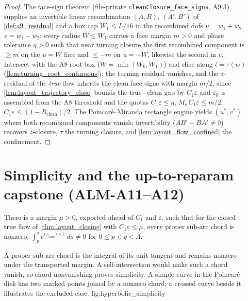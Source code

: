 \begin{proof}
  \leanok
  The face-sign theorem (file-private \texttt{cleanClosure\_face\_signs},
  A9.3) supplies an invertible linear recombination $(A,B)$, $(A',B')$ of
  \cref{def:a9_residual} and a box cap $W_1\le L/16$ in the recombined dofs
  $u=w_1+w_2$, $v=w_1-w_2$: every radius $W\le W_1$ carries a face margin
  $m>0$ and phase tolerance $\eta>0$ such that near turning closure the first
  recombined component is $\ge m$ on the $u=W$ face and $\le-m$ on $u=-W$,
  likewise the second in $v$.  Intersect with the A8 root box
  ($W=\min(W_0,W_1)$) and slice along $t=\tau(w)$
  (\cref{lem:turning_root_continuous}): the turning residual vanishes, and
  the $z$-residual of the \emph{true} flow inherits the clean face signs with
  margin $m/2$, since \cref{lem:layout_trajectory_close} bounds the
  true$-$clean gap by $C_1\varepsilon$ and $\varepsilon_0$ is assembled from
  the A8 threshold and the quotas $C_1\varepsilon\le\eta$,
  $M_c\,C_1\varepsilon\le m/2$,
  $C_1\varepsilon\le(1-R_{\mathrm{clean}})/2$.  The Poincaré--Miranda
  rectangle engine yields $(u^*,v^*)$ where both recombined components
  vanish; invertibility ($AB'-BA'\ne0$) recovers $z$-closure, $\tau$ the
  turning closure, and \cref{lem:layout_flow_confined} the confinement.
\end{proof}

\section{Simplicity and the up-to-reparam capstone (ALM-A11--A12)}

\begin{lemma}
  \label{lem:layout_chord_ne_zero}
  There is a margin $\mu>0$, exported ahead of $C_1$ and $\varepsilon$, such
  that for the closed true flow of \cref{thm:layout_closing} with
  $C_1\varepsilon\le\mu$, every proper sub-arc chord is nonzero:
  $\int_p^q e^{i\varphi_{\mathrm{true}}(s)}\,ds\ne0$ for
  $0\le p<q<\Lambda$.
\end{lemma}

  {A proper sub-arc chord is the integral of its unit tangent and remains
   nonzero under the transported margin. A self-intersection would make such a
   chord vanish, so chord nonvanishing proves simplicity.}
  {A simple curve in the Poincaré disk has two marked points joined by a
   nonzero chord; a crossed curve beside it illustrates the excluded case.}
  {fig:hyperbolic_simplicity}

